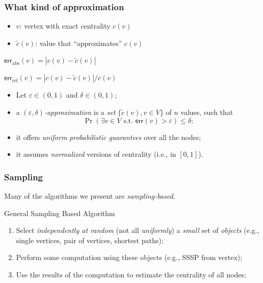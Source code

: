 \begin{frame}
  \frametitle{What kind of approximation}
  \begin{itemize}
    \item $v$: vertex with exact centrality $c(v)$
    \item $\tilde{c}(v)$: value that ``approximates'' $c(v)$
  \end{itemize}
  \begin{definition}
    \centering
    $\mathsf{err}_\mathrm{abs}(v)=|c(v)-\tilde{c}(v)|$
  \end{definition}
  \begin{definition}
    \centering
    $\mathsf{err}_\mathrm{rel}(v)=|c(v)-\tilde{c}(v)|/c(v)$
  \end{definition}
  \pause
  \begin{definition}
    \begin{itemize}
      \item Let $\varepsilon\in(0,1)$ and $\delta\in(0,1)$;
      \item a \emph{$(\varepsilon,\delta)$-approximation} is a \emph{set}
        $\{\tilde{c}(v), v\in V\}$ of $n$ values, such that
        \[
          \Pr\left(\exists v\in V \text{ s.t. } \mathsf{err}(v)
          >\varepsilon\right)\le \delta;
        \]
        \vspace{-20pt}
      \pause
      \item it offers \emph{uniform probabilistic guarantees} over all the
        nodes;
        \pause
      \item it assumes \emph{normalized} versions of centrality (i.e., in
        $[0,1]$).
    \end{itemize}
  \end{definition}
\end{frame}

\begin{frame}
  \frametitle{Sampling}
  Many of the algorithms we present are \emph{sampling-based}.
  \begin{block}{General Sampling Based Algorithm}
    \begin{enumerate}
      \item Select \emph{independently at random} (not all \emph{uniformly})
        a \emph{small} set of \emph{objects} (e.g., single vertices, pair of vertices, shortest
        paths);
        \pause
      \item Perform some computation using these objects (e.g., SSSP from vertex);
        \pause
      \item Use the results of the computation to estimate the centrality of all
        nodes;
    \end{enumerate}
  \end{block}
\end{frame}

